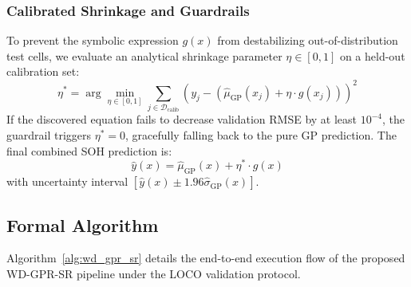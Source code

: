 \documentclass[a4paper,fleqn]{cas-sc}
\begin{document}
\subsubsection{Calibrated Shrinkage and Guardrails}
To prevent the symbolic expression $g(x)$ from destabilizing out-of-distribution test cells, we evaluate an analytical shrinkage parameter $\eta \in [0, 1]$ on a held-out calibration set:
\begin{equation}
    \eta^* = \arg\min_{\eta \in [0, 1]} \sum_{j \in \mathcal{D}_{\text{calib}}} \left( y_j - (\hat{\mu}_{\text{GP}}(x_j) + \eta \cdot g(x_j)) \right)^2
\end{equation}
If the discovered equation fails to decrease validation RMSE by at least $10^{-4}$, the guardrail triggers $\eta^* = 0$, gracefully falling back to the pure GP prediction. The final combined SOH prediction is:
\begin{equation}
    \hat{y}(x) = \hat{\mu}_{\text{GP}}(x) + \eta^* \cdot g(x)
\end{equation}
with uncertainty interval $[\hat{y}(x) \pm 1.96 \hat{\sigma}_{\text{GP}}(x)]$.

\subsection{Formal Algorithm}
Algorithm~\ref{alg:wd_gpr_sr} details the end-to-end execution flow of the proposed WD-GPR-SR pipeline under the LOCO validation protocol.
\end{document}
